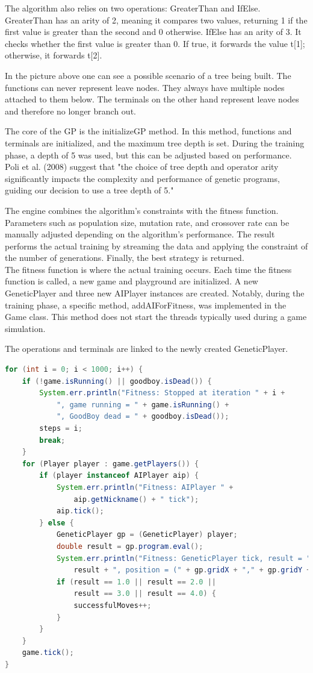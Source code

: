 \documentclass[sigconf]{acmart} %
\begin{document}
The algorithm also relies on two operations: GreaterThan and IfElse. GreaterThan has an arity of 2, meaning it compares two values, returning 1 if the first value is greater than the second and 0 otherwise. IfElse has an arity of 3. It checks whether the first value is greater than 0. If true, it forwards the value t[1]; otherwise, it forwards t[2].


In the picture above one can see a possible scenario of a tree being built. The functions can never represent leave nodes. They always have multiple nodes attached to them below. The terminals on the other hand represent leave nodes and therefore no longer branch out. 

The core of the GP is the initializeGP method. In this method, functions and terminals are initialized, and the maximum tree depth is set. During the training phase, a depth of 5 was used, but this can be adjusted based on performance. Poli et al. (2008) suggest that \cite{poli2008fieldguide} "the choice of tree depth and operator arity significantly impacts the complexity and performance of genetic programs, guiding our decision to use a tree depth of 5." 

The engine combines the algorithm's constraints with the fitness function. Parameters such as population size, mutation rate, and crossover rate can be manually adjusted depending on the algorithm's performance. The result performs the actual training by streaming the data and applying the constraint of the number of generations. Finally, the best strategy is returned. \\ 
The fitness function is where the actual training occurs. Each time the fitness function is called, a new game and playground are initialized. A new GeneticPlayer and three new AIPlayer instances are created. Notably, during the training phase, a specific method, addAIForFitness, was implemented in the Game class. This method does not start the threads typically used during a game simulation.

The operations and terminals are linked to the newly created GeneticPlayer. 

\begin{lstlisting}[language=Java]
for (int i = 0; i < 1000; i++) {
    if (!game.isRunning() || goodboy.isDead()) {
        System.err.println("Fitness: Stopped at iteration " + i +
            ", game running = " + game.isRunning() +
            ", GoodBoy dead = " + goodboy.isDead());
        steps = i;
        break;
    }
    for (Player player : game.getPlayers()) {
        if (player instanceof AIPlayer aip) {
            System.err.println("Fitness: AIPlayer " +
                aip.getNickname() + " tick");
            aip.tick();
        } else {
            GeneticPlayer gp = (GeneticPlayer) player;
            double result = gp.program.eval();
            System.err.println("Fitness: GeneticPlayer tick, result = " +
                result + ", position = (" + gp.gridX + "," + gp.gridY + ")");
            if (result == 1.0 || result == 2.0 ||
                result == 3.0 || result == 4.0) {
                successfulMoves++;
            }
        }
    }
    game.tick();
}
\end{lstlisting}
\end{document}
